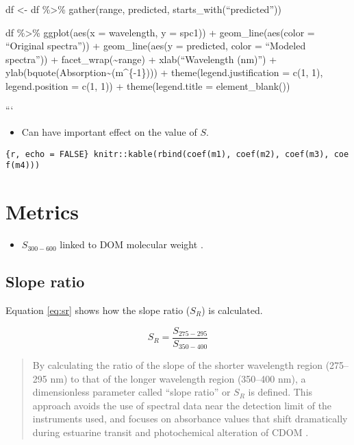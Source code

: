 \documentclass[]{book}
\providecommand{\tightlist}{%
  \setlength{\itemsep}{0pt}\setlength{\parskip}{0pt}}
\theoremstyle{definition}
\theoremstyle{definition}
\theoremstyle{remark}
\begin{document}
df \textless{}- df \%\textgreater{}\% gather(range, predicted,
starts\_with(``predicted''))

df \%\textgreater{}\% ggplot(aes(x = wavelength, y = spc1)) +
geom\_line(aes(color = ``Original spectra'')) + geom\_line(aes(y =
predicted, color = ``Modeled spectra'')) +
facet\_wrap(\textasciitilde{}range) + xlab(``Wavelength (nm)'') +
ylab(bquote(Absorption\textasciitilde{}(m\^{}\{-1\}))) +
theme(legend.justification = c(1, 1), legend.position = c(1, 1)) +
theme(legend.title = element\_blank())

```

\begin{itemize}
\tightlist
\item
  Can have important effect on the value of \(S\).
\end{itemize}

\texttt{\{r,\ echo\ =\ FALSE\}\ knitr::kable(rbind(coef(m1),\ coef(m2),\ coef(m3),\ coef(m4)))}

\section{Metrics}\label{metrics}

\begin{itemize}
\tightlist
\item
  \(S_{300-600}\) linked to DOM molecular weight \citep{Stedmon2015b}.
\end{itemize}

\subsection{Slope ratio}\label{slope-ratio}

Equation \eqref{eq:sr} shows how the slope ratio (\(S_R\)) is calculated.

\begin{equation}
S_R = \frac{S_{275-295}}{S_{350-400}}
\label{eq:sr}
\end{equation}

\begin{quote}
By calculating the ratio of the slope of the shorter wavelength region
(275--295 nm) to that of the longer wavelength region (350--400 nm), a
dimensionless parameter called ``slope ratio'' or \(S_R\) is defined.
This approach avoids the use of spectral data near the detection limit
of the instruments used, and focuses on absorbance values that shift
dramatically during estuarine transit and photochemical alteration of
CDOM \citep{Helms2008}.
\end{quote}
\end{document}
